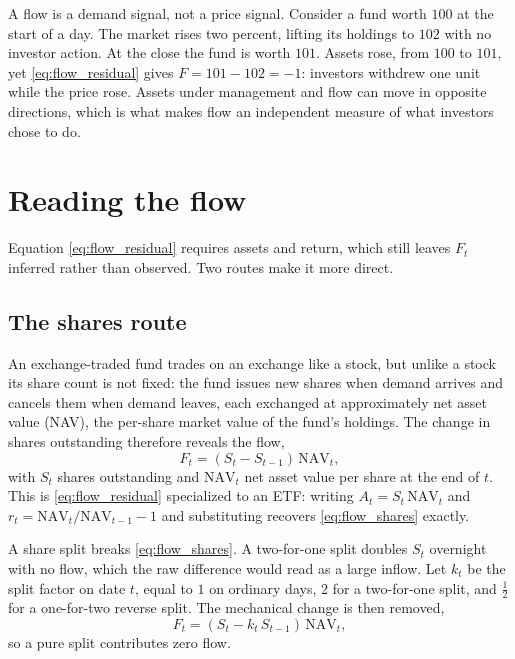 \documentclass[11pt]{article}
\begin{document}
A flow is a demand signal, not a price signal. Consider a fund worth $100$ at the start
of a day. The market rises two percent, lifting its holdings to $102$ with no investor
action. At the close the fund is worth $101$. Assets rose, from $100$ to $101$, yet
\eqref{eq:flow_residual} gives $F = 101 - 102 = -1$: investors withdrew one unit while
the price rose. Assets under management and flow can move in opposite directions, which
is what makes flow an independent measure of what investors chose to do.

\section{Reading the flow}
\label{sec:reading-flow}

Equation \eqref{eq:flow_residual} requires assets and return, which still leaves $F_t$
inferred rather than observed. Two routes make it more direct.

\subsection{The shares route}

An exchange-traded fund trades on an exchange like a stock, but unlike a stock its share
count is not fixed: the fund issues new shares when demand arrives and cancels them when
demand leaves, each exchanged at approximately net asset value (NAV), the per-share
market value of the fund's holdings. The change in shares outstanding therefore reveals
the flow,
\begin{equation}
\label{eq:flow_shares}
F_t = (S_t - S_{t-1})\,\mathrm{NAV}_t,
\end{equation}
with $S_t$ shares outstanding and $\mathrm{NAV}_t$ net asset value per share at the end
of $t$. This is \eqref{eq:flow_residual} specialized to an ETF: writing $A_t = S_t\,
\mathrm{NAV}_t$ and $r_t = \mathrm{NAV}_t / \mathrm{NAV}_{t-1} - 1$ and substituting
recovers \eqref{eq:flow_shares} exactly.

A share split breaks \eqref{eq:flow_shares}. A two-for-one split doubles $S_t$ overnight
with no flow, which the raw difference would read as a large inflow. Let $k_t$ be the
split factor on date $t$, equal to $1$ on ordinary days, $2$ for a two-for-one split,
and $\tfrac12$ for a one-for-two reverse split. The mechanical change is then removed,
\begin{equation}
\label{eq:flow_split}
F_t = (S_t - k_t\,S_{t-1})\,\mathrm{NAV}_t,
\end{equation}
so a pure split contributes zero flow.
\end{document}
